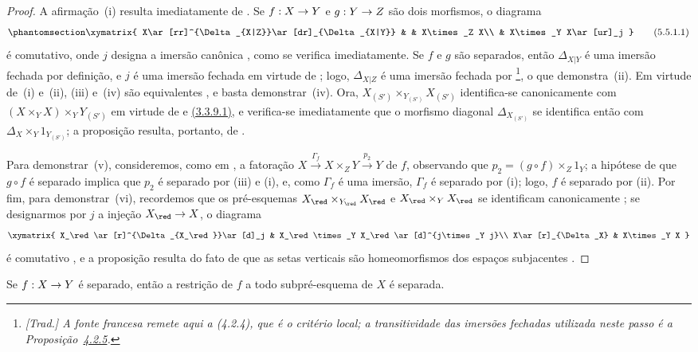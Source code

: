 \documentclass[oneside]{amsart}
\makeatletter
\newcommand{\ega@arrow}[2]{\mathchoice{#1}{#2}{#2}{#2}}
\renewcommand{\to}{\ega@arrow{\longrightarrow}{\rightarrow}}
\newcommand{\oldpage}[2][]{{\marginnote{\normalfont\textbf{#1}~|~#2}}\ignorespaces}
\let\EGAOriginalLabel\label
\renewcommand{\label}[1]{\phantomsection\EGAOriginalLabel{#1}}
\makeatother
\begin{document}
\begin{proof}
A afirmação~(i) resulta imediatamente de .
Se $f:X\to Y$ e $g:Y\to Z$ são dois morfismos, o diagrama
\[
\label{I.5.5.1.1}
  \xymatrix{
    X\ar[rr]^{\Delta_{X|Z}}\ar[dr]_{\Delta_{X|Y}} & &
    X\times_Z X\\
    & X\times_Y X\ar[ur]_j
  }
  \tag{5.5.1.1}
\]
é comutativo, onde $j$ designa a imersão canônica , como se
verifica imediatamente.
Se $f$ e $g$ são separados, então $\Delta_{X|Y}$ é uma imersão fechada por
definição, e $j$ é uma imersão fechada em virtude de ; logo,
$\Delta_{X|Z}$ é uma imersão fechada por \footnote{\emph{[Trad.]
A fonte francesa remete aqui a (4.2.4), que é o critério local; a transitividade
das imersões fechadas utilizada neste passo é a Proposição~\hyperref[I.4.2.5]{4.2.5}.}}, o que
\oldpage[I]{137}
demonstra~(ii).
Em virtude de~(i) e~(ii), (iii) e~(iv) são equivalentes , e
basta demonstrar~(iv).
Ora, $X_{(S')}\times_{Y_{(S')}}X_{(S')}$ identifica-se canonicamente com
$(X\times_Y X)\times_Y Y_{(S')}$ em virtude de  e
\hyperref[I.3.3.9.1]{(3.3.9.1)}, e verifica-se imediatamente que o morfismo
diagonal $\Delta_{X_{(S')}}$ se identifica então com
$\Delta_X\times_Y 1_{Y_{(S')}}$; a proposição resulta, portanto, de
.

Para demonstrar~(v), consideremos, como em , a fatoração
$X\xrightarrow{\Gamma_f}X\times_Z Y\xrightarrow{p_2}Y$ de $f$, observando
que $p_2=(g\circ f)\times_Z 1_Y$; a hipótese de que $g\circ f$ é separado
implica que $p_2$ é separado por (iii) e (i), e, como $\Gamma_f$ é uma
imersão, $\Gamma_f$ é separado por (i); logo, $f$ é separado por (ii).
Por fim, para demonstrar~(vi), recordemos que os pré-esquemas
$X_\red\times_{Y_\red}X_\red$ e $X_\red\times_Y X_\red$ se identificam
canonicamente ; se designarmos por $j$ a injeção
$X_\red\to X$, o diagrama
\[
  \xymatrix{
    X_\red\ar[r]^{\Delta_{X_\red}}\ar[d]_j &
    X_\red\times_Y X_\red\ar[d]^{j\times_Y j}\\
    X\ar[r]_{\Delta_X} & X\times_Y X
  }
\]
é comutativo , e a proposição resulta do fato de que as setas
verticais são homeomorfismos dos espaços subjacentes .
\end{proof}

\begin{corollary}[5.5.2]
\label{I.5.5.2}
Se $f:X\to Y$ é separado, então a restrição de $f$ a todo subpré-esquema de
$X$ é separada.
\end{corollary}
\end{document}
